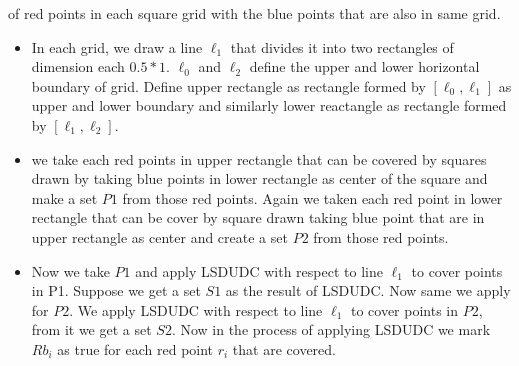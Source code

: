 \documentclass[10pt,a4wide]{report}
\theoremstyle{plain}
\theoremstyle{definition}
\theoremstyle{remark}
\begin{document}
                            of red points in each square grid with the blue points that are also in same grid.
                            \begin{itemize}
                             \item In each grid, we draw a line $\ell_{1}$ that divides it into two rectangles of dimension each $0.5 \ast 1$.
                                    $\ell_{0}$ and $\ell_{2}$ define the upper and lower horizontal boundary of grid. Define upper rectangle
                                   as rectangle formed by $[\ell_{0},\ell_{1}]$ as upper and lower boundary and similarly lower reactangle as rectangle formed by $[\ell_{1},\ell_{2}]$.
                                
                             \item we take each red points in upper rectangle that can be covered by squares drawn by taking blue points 
                                   in lower rectangle as center of the square and make a set $P1$ from those red points. Again we taken each 
                                   red point in lower rectangle that can be cover by square drawn taking blue point that are in upper 
                                   rectangle as center and create a set $P2$ from those red points.
			      \item Now we take $P1$ and apply LSDUDC with respect to line $\ell_{1}$ to cover points in P1. Suppose we get a set 
                                   $S1$ as the result of LSDUDC. Now same we apply for $P2$. We apply LSDUDC 
                                   with respect to line $\ell_{1}$ to cover points in $P2$, from it we get a set $S2$. Now in the 
                                   process of applying LSDUDC we mark $Rb_{i}$ as true for each red point $r_{i}$ that are covered.
                           

\end{itemize}
\end{document}
